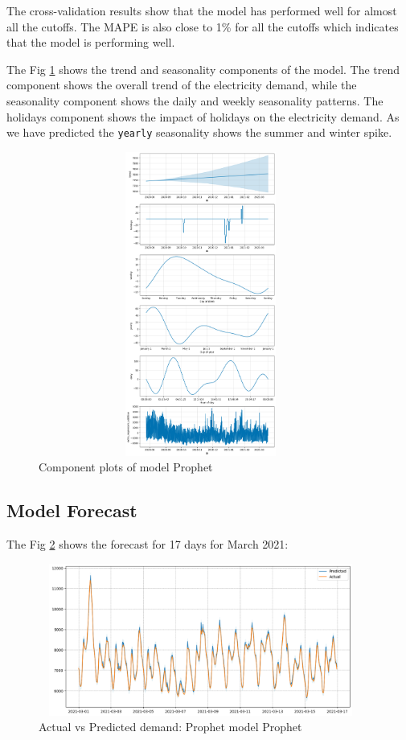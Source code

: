 \documentclass[mstat,12pt]{unswthesis}
\begin{document}
The cross-validation results show that the model has performed well for
almost all the cutoffs. The MAPE is also close to 1\% for all the
cutoffs which indicates that the model is performing well.

The Fig \ref{prophet_component_plot} shows the trend and seasonality
components of the model. The trend component shows the overall trend of
the electricity demand, while the seasonality component shows the daily
and weekly seasonality patterns. The holidays component shows the impact
of holidays on the electricity demand. As we have predicted the
\texttt{yearly} seasonality shows the summer and winter spike.

\begin{figure}[H]
\centering
\includegraphics[width=0.95\textwidth, height=10cm]{prophet_component_plot.png}
\caption{Component plots of model Prophet}\label{prophet_component_plot}
\end{figure}

\subsection{Model Forecast}\label{model-forecast}

The Fig \ref{prophet_actual_predict_output} shows the forecast for 17
days for March 2021:

\begin{figure}[H]
\centering
\includegraphics[width=0.95\textwidth, height=5cm]{prophet_actual_predict_output.png}
\caption{Actual vs Predicted demand: Prophet model Prophet}\label{prophet_actual_predict_output}
\end{figure}
\end{document}
